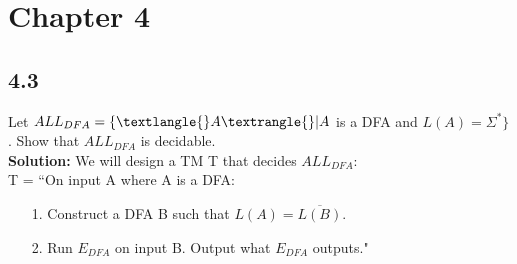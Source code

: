 \section{Chapter 4}

\subsection*{4.3} Let $ALL_{DFA} = \{\textlangle{}A\textrangle{} | A$ is a DFA and $L(A) = \Sigma^*\}$. Show that $ALL_{DFA}$ is decidable.
\\
\textbf{Solution:} We will design a TM T that decides $ALL_{DFA}$:
\\
T = ``On input \textlangle{}A\textrangle{} where A is a DFA:
\begin{enumerate}
\itemsep0em
\item[1.]Construct a DFA B such that $L(A) = \overline{L(B)}$.
\item[2.]Run $E_{DFA}$ on input \textlangle{}B\textrangle{}. Output what $E_{DFA}$ outputs."
\end{enumerate}
